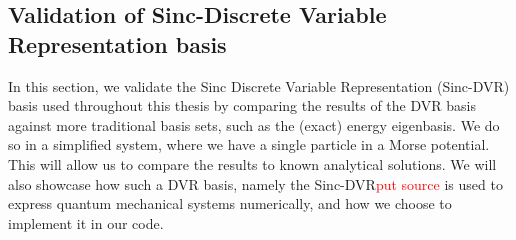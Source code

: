 \documentclass{subfiles}
\begin{document}
\subsection{Validation of Sinc-Discrete Variable Representation basis}\label{sec:sinc_dvr_validation}
In this section, we validate the Sinc Discrete Variable Representation (Sinc-DVR) basis used throughout this thesis by comparing the results of the DVR basis against more traditional basis sets, such as the (exact) energy eigenbasis. We do so in a simplified system, where we have a single particle in a Morse potential. This will allow us to compare the results to known analytical solutions. We will also showcase how such a DVR basis, namely the Sinc-DVR\textcolor{red}{put source} is used to express quantum mechanical systems numerically, and how we choose to implement it in our code. 
\end{document}
